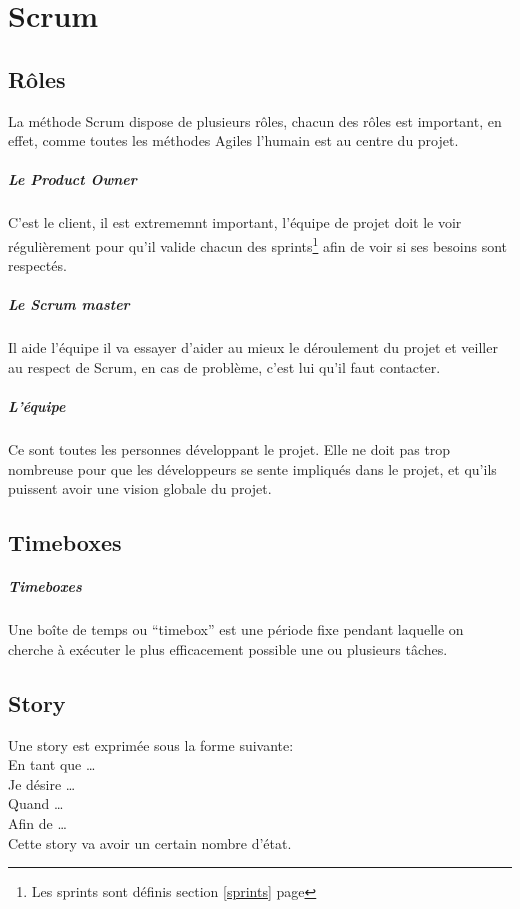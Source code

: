 \chapter{Scrum} \label{scrum}
\nouveauChapitre
	\section{Rôles}
		La méthode Scrum dispose de plusieurs rôles, chacun des rôles est important, en effet, comme toutes les méthodes Agiles l'humain est au centre du projet.
		\paragraph{Le Product Owner} C'est le client, il est extrememnt important, l'équipe de projet doit le voir régulièrement pour qu'il valide chacun des sprints\footnote{
		Les sprints sont définis section \ref{sprints} page \pageref{sprints}} afin de voir si ses besoins sont respectés. 
		\paragraph{Le Scrum master} Il aide l'équipe il va essayer d'aider au mieux le déroulement du projet et veiller au respect de Scrum, en cas de problème, c'est lui qu'il faut contacter.
		\paragraph{L'équipe} Ce sont toutes les personnes développant le projet. Elle ne doit pas trop nombreuse pour que les développeurs se sente impliqués dans le projet, et qu'ils puissent avoir
		une vision globale du projet.
	\section{Timeboxes}
		\paragraph{Timeboxes} 
		Une boîte de temps ou ``timebox'' est une période fixe pendant laquelle on cherche à exécuter le plus efficacement possible une ou plusieurs tâches.
	\section{Story}
		Une story est exprimée sous la forme suivante: \\
		En tant que \ldots\\
		Je désire \ldots\\
		Quand \ldots\\
		Afin de \ldots\\
		Cette story va avoir un certain nombre d'état. 
